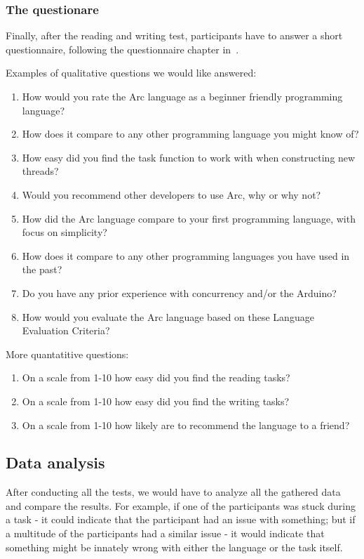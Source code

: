 \subsubsection{The questionare}
Finally, after the reading and writing test, participants have to answer a short questionnaire, following the questionnaire chapter in~\cite[p.~146,~224-235]{benyon_2014}.

Examples of qualitative questions we would like answered: 

\begin{enumerate}
    \item How would you rate the Arc language as a beginner friendly programming language?
    \item How does it compare to any other programming language you might know of?
    \item How easy did you find the task function to work with when constructing new threads?
    \item Would you recommend other developers to use Arc, why or why not?
    \item How did the Arc language compare to your first programming language, with focus on simplicity?
    \item How does it compare to any other programming languages you have used in the past?
    \item Do you have any prior experience with concurrency and/or the Arduino?
    \item How would you evaluate the Arc language based on these Language Evaluation Criteria?
\end{enumerate}

More quantatitive questions: 
\begin{enumerate}
    \item On a scale from 1-10 how easy did you find the reading tasks?
    \item On a scale from 1-10 how easy did you find the writing tasks?
    \item On a scale from 1-10 how likely are to recommend the language to a friend?
\end{enumerate}

\subsection{Data analysis}\label{subsubsec:analysisOfTheData}
After conducting all the tests, we would have to analyze all the gathered data and compare the results. For example, if one of the participants was stuck during a task - it could indicate that the participant had an issue with something; but if a multitude of the participants had a similar issue - it would indicate that something might be innately wrong with either the language or the task itself.

